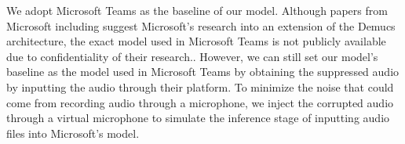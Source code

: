 \documentclass[11pt]{article}
\begin{document}
We adopt Microsoft Teams as the baseline of our model. Although papers from Microsoft including \cite{microsoftTeams} suggest Microsoft’s research into an extension of the Demucs architecture, the exact model used in Microsoft Teams is not publicly available due to confidentiality of their research.. However, we can still set our model’s baseline as the model used in Microsoft Teams by obtaining the suppressed audio by inputting the audio through their platform. To minimize the noise that could come from recording audio through a microphone, we inject the corrupted audio through a virtual microphone to simulate the inference stage of inputting audio files into Microsoft’s model.




\end{document}
